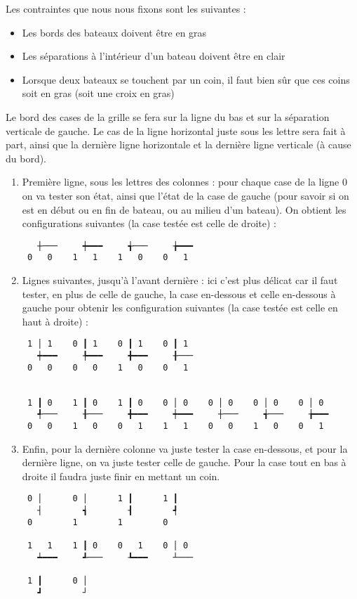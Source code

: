 Les contraintes que nous nous fixons sont les suivantes :
\begin{itemize}
\item Les bords des bateaux doivent être en gras
\item Les séparations à l'intérieur d'un bateau doivent être en clair
\item Lorsque deux bateaux se touchent par un coin, il faut bien sûr que ces coins soit en gras (soit une croix en gras)
\end{itemize}


Le bord des cases de la grille se fera sur la ligne du bas et sur la séparation verticale de gauche. Le cas de la ligne horizontal juste sous les lettre sera fait à part, ainsi que la dernière ligne horizontale et la dernière ligne verticale (à cause du bord).

\begin{enumerate}
\item Première ligne, sous les lettres des colonnes : pour chaque case de la ligne $0$ on va tester son état, ainsi que l'état de la case de gauche (pour savoir si on est en début ou en fin de bateau, ou au milieu d'un bateau). On obtient les configurations suivantes (la case testée est celle de droite) :

\begin{verbatim}
   ┼───     ┿━━━     ╅───     ╆━━━
 0   0    1   1    1   0    0   1
\end{verbatim}


\item Lignes suivantes, jusqu'à l'avant dernière : ici c'est plus délicat car il faut tester, en plus de celle de gauche, la case en-dessous et celle en-dessous à gauche pour obtenir les configuration suivantes (la case testée est celle en haut à droite) :

\begin{verbatim}
 1 │ 1    0 ┃ 1    0 ┃ 1    0 ┃ 1
   ┿━━━     ╄━━━     ╋━━━     ╂───
 0   0    0   0    1   0    0   1
  
 
 1 ┃ 0    1 ┃ 0    1 ┃ 0    0 │ 0    0 │ 0    0 │ 0    0 │ 0
   ╃───     ╂───     ╋━━━     ┿━━━     ┼───     ╅───     ╆━━━
 0   0    1   0    0   1    1   1    0   0    1   0    0   1
\end{verbatim}

\item Enfin, pour la dernière colonne va juste tester la case en-dessous, et pour la dernière ligne, on va juste tester celle de gauche. Pour la case tout en bas à droite il faudra juste finir en mettant un coin.

\begin{verbatim}
 0 │      0 │      1 ┃      1 ┃  
   ┤        ┪        ┨        ┩
 0        1        1        0
 
 1   1    1 ┃ 0    0   1    0 │ 0
   ┷━━━     ┹───     ┺━━━     ┴───

 1 ┃      0 │
   ┛        ┘
\end{verbatim}
\end{enumerate}

